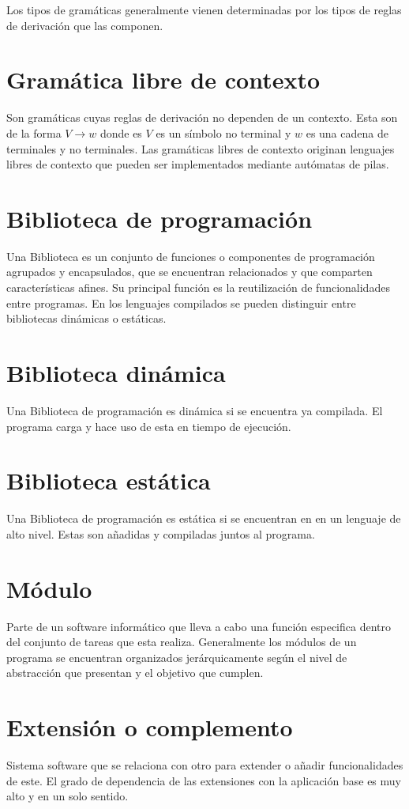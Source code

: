 Los tipos de gramáticas generalmente vienen determinadas por los tipos de reglas de derivación que las componen.

\section {Gramática libre de contexto}
Son gramáticas cuyas reglas de derivación no dependen de un contexto. Esta son de la 
forma $V\rightarrow w$ donde es $V$ es un símbolo no terminal y $w$ es una cadena de terminales y no terminales.
Las gramáticas libres de contexto originan lenguajes libres de contexto que pueden ser implementados mediante
autómatas de pilas. 

\section {Biblioteca de programación}
Una Biblioteca es un conjunto de funciones o componentes de programación agrupados y encapsulados, que se encuentran relacionados y que comparten características afines. 
Su principal función es la reutilización de funcionalidades entre programas. En los lenguajes compilados se pueden distinguir entre bibliotecas dinámicas o estáticas.

\section {Biblioteca dinámica}
Una Biblioteca de programación es dinámica si se encuentra ya compilada. El programa carga y hace uso de esta en tiempo de ejecución.

\section {Biblioteca estática}
Una Biblioteca de programación es estática si se encuentran en en un lenguaje de alto nivel. Estas son añadidas y compiladas juntos al programa.

\section {Módulo}
Parte de un software informático que lleva a cabo una función especifica dentro del conjunto de tareas que esta realiza. Generalmente los módulos
de un programa se encuentran organizados jerárquicamente según el nivel de abstracción que presentan y el objetivo que cumplen.

\section {Extensión o complemento}
Sistema software que se relaciona con otro para extender o añadir funcionalidades de este. El grado de dependencia de las extensiones con la
aplicación base es muy alto y en un solo sentido. 

